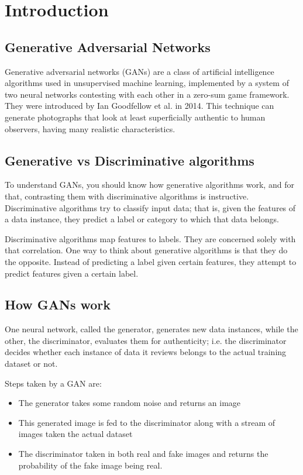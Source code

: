 \chapter{Introduction}
    \section{Generative Adversarial Networks}
    Generative adversarial networks (GANs) are a class of artificial intelligence 
    algorithms used in unsupervised machine learning, implemented by a system of 
    two neural networks contesting with each other in a zero-sum game framework. 
    They were introduced by Ian Goodfellow et al. in 2014\cite{base}. This technique 
    can generate photographs that look at least superficially authentic to human 
    observers, having many realistic characteristics.\cite{improvedtechniques}

    \section{Generative vs Discriminative algorithms}
    To understand GANs, you should know how generative algorithms work, and for 
    that, contrasting them with discriminative algorithms is instructive. 
    Discriminative algorithms try to classify input data; that is, given the 
    features of a data instance, they predict a label or category to which that 
    data belongs.


    Discriminative algorithms map features to labels. They are concerned solely 
    with that correlation. One way to think about generative algorithms is that 
    they do the opposite. Instead of predicting a label given certain features, 
    they attempt to predict features given a certain label.

    \section{How GANs work}

    One neural network, called the generator, generates new data instances, while 
    the other, the discriminator, evaluates them for authenticity; i.e. the 
    discriminator decides whether each instance of data it reviews belongs to the 
    actual training dataset or not.\cite{fourj}

    Steps taken by a GAN are:
    \begin{itemize}
    \item{The generator takes some random noise and returns an image}
    \item{This generated image is fed to the discriminator along with a stream of 
    images taken the actual dataset}
    \item{The discriminator taken in both real and fake images and returns the 
    probability of the fake image being real.}
    \end{itemize}